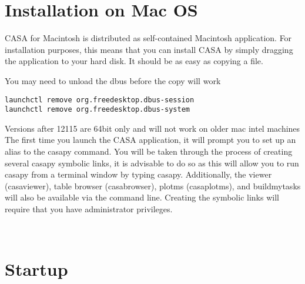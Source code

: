 \section{Installation on Mac OS}

CASA for Macintosh is distributed as self-contained Macintosh
application. For installation purposes, this means that you can
install CASA by simply dragging the application to your hard disk. It
should be as easy as copying a file.


You may need to unload the dbus before the copy will work

\small
\begin{verbatim}
launchctl remove org.freedesktop.dbus-session
launchctl remove org.freedesktop.dbus-system
\end{verbatim}
\normalsize

Versions after 12115 are 64bit only and will not work on older mac
intel machines The first time you launch the CASA application, it will
prompt you to set up an alias to the casapy command. You will be taken
through the process of creating several casapy symbolic links, it is
advisable to do so as this will allow you to run casapy from a
terminal window by typing casapy. Additionally, the viewer
(casaviewer), table browser (casabrowser), plotms (casaplotms), and
buildmytasks will also be available via the command line. Creating the
symbolic links will require that you have administrator privileges.


\


\section{Startup}
\label{section:install.startup}

